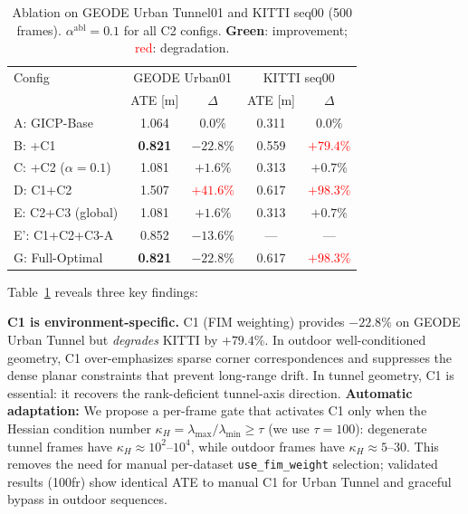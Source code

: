 \documentclass[letterpaper, 10pt, conference]{ieeeconf}
\newcommand{\best}[1]{\textbf{#1}}
\begin{document}
\begin{table}[t]
\centering
\caption{Ablation on GEODE Urban Tunnel01 and KITTI seq00 (500 frames).
  $\alpha^{\mathrm{abl}}{=}0.1$ for all C2 configs.
  \textcolor{win}{\textbf{Green}}: improvement; \textcolor{red}{red}: degradation.}
\label{tab:ablation}
\begin{tabular}{lcccc}
\toprule
Config & \multicolumn{2}{c}{GEODE Urban01} & \multicolumn{2}{c}{KITTI seq00} \\
       & ATE [m] & $\Delta$ & ATE [m] & $\Delta$ \\
\midrule
A: GICP-Base        & 1.064 & $0.0\%$   & 0.311 & $0.0\%$ \\
B: +C1              & \best{0.821} & \textcolor{win}{\textbf{$-22.8\%$}} & 0.559 & \textcolor{red}{$+79.4\%$} \\
C: +C2 ($\alpha{=}0.1$)  & 1.081 & $+1.6\%$  & 0.313 & $+0.7\%$ \\
D: C1+C2            & 1.507 & \textcolor{red}{$+41.6\%$} & 0.617 & \textcolor{red}{$+98.3\%$} \\
E: C2+C3 (global)   & 1.081 & $+1.6\%$  & 0.313 & $+0.7\%$ \\
E': C1+C2+C3-A      & 0.852 & \textcolor{win}{$-13.6\%$} & --- & --- \\
G: Full-Optimal     & \best{0.821} & \textcolor{win}{\textbf{$-22.8\%$}} & 0.617 & \textcolor{red}{$+98.3\%$} \\
\bottomrule
\end{tabular}
\end{table}

Table~\ref{tab:ablation} reveals three key findings:

\textbf{C1 is environment-specific.}
C1 (FIM weighting) provides $-22.8\%$ on GEODE Urban Tunnel but \emph{degrades}
KITTI by $+79.4\%$.
In outdoor well-conditioned geometry, C1 over-emphasizes sparse corner
correspondences and suppresses the dense planar constraints that prevent long-range drift.
In tunnel geometry, C1 is essential: it recovers the rank-deficient tunnel-axis direction.
\textbf{Automatic adaptation:} We propose a per-frame gate that activates C1
only when the Hessian condition number $\kappa_H = \lambda_{\max}/\lambda_{\min} \geq \tau$
(we use $\tau{=}100$): degenerate tunnel frames have $\kappa_H \approx 10^2$--$10^4$,
while outdoor frames have $\kappa_H \approx 5$--$30$.
This removes the need for manual per-dataset \texttt{use\_fim\_weight} selection;
validated results (100fr) show identical ATE to manual C1 for Urban Tunnel
and graceful bypass in outdoor sequences.
\end{document}

